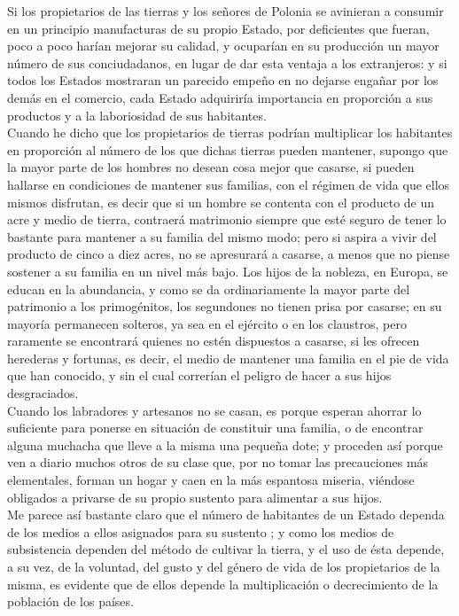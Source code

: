 \documentclass[10pt]{article}
\begin{document}
\begin{multicols}{1}
Si los propietarios de las tierras y los señores de Polonia se avinieran a consumir en un principio manufacturas de su propio Estado, por deficientes que fueran, poco a poco harían mejorar su calidad, y ocuparían en su producción un mayor número de sus conciudadanos, en lugar de dar esta ventaja a los extranjeros: y si todos los Estados mostraran un parecido empeño en no dejarse engañar por los demás en el comercio, cada Estado adquiriría importancia en proporción a sus productos y a la laboriosidad de sus habitantes.\\ 
Cuando he dicho que los propietarios de tierras podrían multiplicar los habitantes en proporción al número de los que dichas tierras pueden mantener, supongo que la mayor parte de los hombres no desean cosa mejor que casarse, si pueden hallarse en condiciones de mantener sus familias, con el régimen de vida que ellos mismos disfrutan, es decir que si un hombre se contenta con el producto de un acre y medio de tierra, contraerá matrimonio siempre que esté seguro de tener lo bastante para mantener a su familia del mismo modo; pero si aspira a vivir del producto de cinco a diez acres, no se apresurará a casarse, a menos que no piense sostener a su familia en un nivel más bajo. Los hijos de la nobleza, en Europa, se educan en la abundancia, y como se da ordinariamente la mayor parte del patrimonio a los primogénitos, los segundones no tienen prisa por casarse; en su mayoría permanecen solteros, ya sea en el ejército o en los claustros, pero raramente se encontrará quienes no estén dispuestos a casarse, si les ofrecen herederas y fortunas, es decir, el medio de mantener una familia en el pie de vida que han conocido, y sin el cual correrían el peligro de hacer a sus hijos desgraciados.\\
Cuando los labradores y artesanos no se casan, es porque esperan ahorrar lo suficiente para ponerse en situación de constituir una familia, o de encontrar alguna muchacha que lleve a la misma una pequeña dote; y proceden así porque ven a diario muchos otros de su clase que, por no tomar las precauciones más elementales, forman un hogar y caen en la más espantosa miseria, viéndose obligados a privarse de su propio sustento para alimentar a sus hijos.\\
Me parece así bastante claro que el número de habitantes de un Estado dependa de los medios a ellos asignados para su sustento ; y como los medios de subsistencia dependen del método de cultivar la tierra, y el uso de ésta depende, a su vez, de la voluntad, del gusto y del género de vida de los propietarios de la misma, es evidente que de ellos depende la multiplicación o decrecimiento de la población de los países.

\end{multicols}
\end{document}
